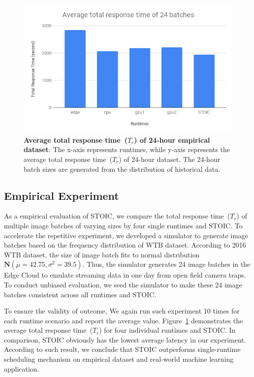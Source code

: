 \begin{figure}[t] \centering 
\includegraphics[scale=0.42]{figures/24-batches}
\caption{\textbf{Average total response time~($T_r$) of 24-hour empirical dataset}: The x-axis represents runtimes, while y-axis represents the average total response time~($T_r$) of 24-hour dataset. The 24-hour batch sizes are generated from the distribution of historical data. 
\label{fig:24-batch}}
\end{figure}


\subsection{Empirical Experiment}

As a empirical evaluation of STOIC, we compare the total response time~($T_r$) of multiple image batches of varying sizes by four single runtimes and STOIC. To accelerate the repetitive experiment, we developed a simulator to generate image batches based on the frequency distribution of WTB dataset. According to 2016 WTB dataset, the size of image batch fits to normal distribution $\mathbf{N}(\mu = 42.75, \sigma^2 = 39.5)$. Thus, the simulator generates 24 image batches in the Edge Cloud to emulate streaming data in one day from open field camera traps. To conduct unbiased evaluation, we seed the simulator to make these 24 image batches consistent across all runtimes and STOIC. 

To ensure the validity of outcome, We again run such experiment 10 times for each runtime scenario and report the average value. Figure~\ref{fig:24-batch} demonstrates the average total response time~($T_r$) for four individual runtimes and STOIC. In comparison, STOIC obviously has the lowest average latency in our experiment. According to such result, we conclude that STOIC outperforms single-runtime scheduling mechanism on empirical dataset and real-world machine learning application.



